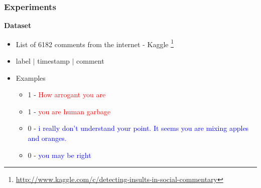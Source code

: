 \documentclass[xcolor=table]{beamer}
\begin{document}
    \begin{frame}
        \frametitle{Experiments}
        \begin{center}
            \textbf{Dataset}
        \end{center}
        \begin{itemize}
            \item{List of 6182 comments from the internet - Kaggle \footnote{\url{http://www.kaggle.com/c/detecting-insults-in-social-commentary}}}
            \item{label $|$ timestamp $|$ comment}
            \item{
            Examples
            \begin{itemize}
                \item{1 - \textcolor{red}{How arrogant you are}}
                \item{1 - \textcolor{red}{you are human garbage}}
                \item{0 - \textcolor{blue}{i really don't understand your point. It seems you are mixing apples and oranges.}}
                \item{0 - \textcolor{blue}{you may be right}}
            \end{itemize}
            }
        \end{itemize}
    \end{frame}
    
\end{document}
